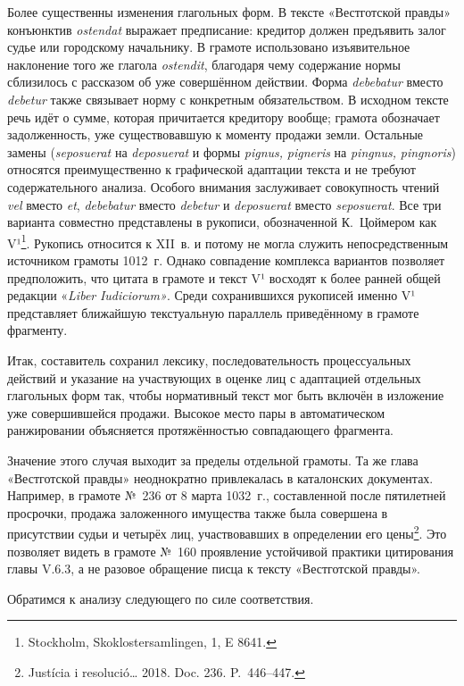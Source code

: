 Более существенны изменения глагольных форм. В тексте «Вестготской правды» конъюнктив \emph{ostendat} выражает предписание: кредитор должен предъявить залог судье или городскому начальнику. В грамоте использовано изъявительное наклонение того же глагола \emph{ostendit}, благодаря чему содержание нормы сблизилось с рассказом об уже совершённом действии. Форма \emph{debebatur} вместо \emph{debetur} также связывает норму с конкретным обязательством. В исходном тексте речь идёт о сумме, которая причитается кредитору вообще; грамота обозначает задолженность, уже существовавшую к моменту продажи земли. Остальные замены (\emph{seposuerat} на \emph{deposuerat} и формы \emph{pignus}\emph{, }\emph{pigneris} на \emph{pingnus}\emph{, }\emph{pingnoris}) относятся преимущественно к графической адаптации текста и не требуют содержательного анализа. Особого внимания заслуживает совокупность чтений \emph{vel} вместо \emph{et}, \emph{debebatur} вместо \emph{debetur} и \emph{deposuerat} вместо \emph{seposuerat}. Все три варианта совместно представлены в рукописи, обозначенной К.~Цоймером как V¹\footnote{Stockholm, Skoklostersamlingen, 1, E 8641.}. Рукопись относится к XII~в. и потому не могла служить непосредственным источником грамоты 1012~г. Однако совпадение комплекса вариантов позволяет предположить, что цитата в грамоте и текст V¹ восходят к более ранней общей редакции «\emph{Liber}\emph{ }\emph{Iudiciorum}\emph{»}. Среди сохранившихся рукописей именно V¹ представляет ближайшую текстуальную параллель приведённому в грамоте фрагменту.

Итак, составитель сохранил лексику, последовательность процессуальных действий и указание на участвующих в оценке лиц с адаптацией отдельных глагольных форм так, чтобы нормативный текст мог быть включён в изложение уже совершившейся продажи. Высокое место пары в автоматическом ранжировании объясняется протяжённостью совпадающего фрагмента.

Значение этого случая выходит за пределы отдельной грамоты. Та же глава «Вестготской правды» неоднократно привлекалась в каталонских документах. Например, в грамоте №~236 от 8 марта 1032~г., составленной после пятилетней просрочки, продажа заложенного имущества также была совершена в присутствии судьи и четырёх лиц, участвовавших в определении его цены\footnote{Justícia i resolució… 2018. Doc. 236. P.~446--447.}. Это позволяет видеть в грамоте №~160 проявление устойчивой практики цитирования главы V.6.3, а не разовое обращение писца к тексту «Вестготской правды».

Обратимся к анализу следующего по силе соответствия.

